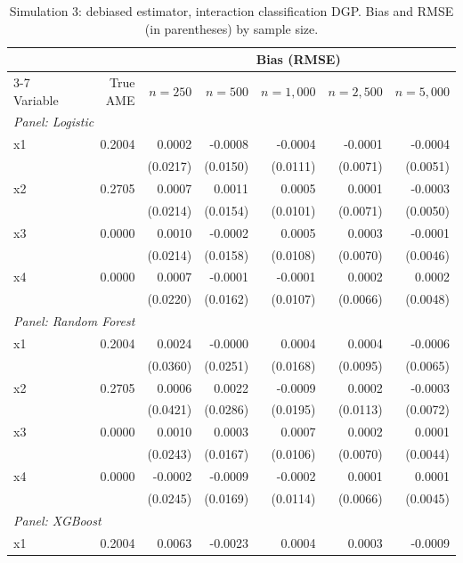 \begin{table}[htbp]
\centering
\small
\begin{threeparttable}
\caption{Simulation 3: debiased estimator, interaction classification DGP. Bias and RMSE (in parentheses) by sample size.}
\label{tab:sim3_bias_classification_interaction}
\begin{tabular}{lrrrrrr}
\toprule
 & & \multicolumn{5}{c}{Bias (RMSE)} \\
\cmidrule(lr){3-7}
Variable & True AME & $n=250$ & $n=500$ & $n=1,000$ & $n=2,500$ & $n=5,000$ \\
\midrule
\multicolumn{7}{l}{\textit{Panel: Logistic}} \\
\quad x1 & 0.2004 & 0.0002 & -0.0008 & -0.0004 & -0.0001 & -0.0004 \\
 &  & (0.0217) & (0.0150) & (0.0111) & (0.0071) & (0.0051) \\
\quad x2 & 0.2705 & 0.0007 & 0.0011 & 0.0005 & 0.0001 & -0.0003 \\
 &  & (0.0214) & (0.0154) & (0.0101) & (0.0071) & (0.0050) \\
\quad x3 & 0.0000 & 0.0010 & -0.0002 & 0.0005 & 0.0003 & -0.0001 \\
 &  & (0.0214) & (0.0158) & (0.0108) & (0.0070) & (0.0046) \\
\quad x4 & 0.0000 & 0.0007 & -0.0001 & -0.0001 & 0.0002 & 0.0002 \\
 &  & (0.0220) & (0.0162) & (0.0107) & (0.0066) & (0.0048) \\
\midrule
\multicolumn{7}{l}{\textit{Panel: Random Forest}} \\
\quad x1 & 0.2004 & 0.0024 & -0.0000 & 0.0004 & 0.0004 & -0.0006 \\
 &  & (0.0360) & (0.0251) & (0.0168) & (0.0095) & (0.0065) \\
\quad x2 & 0.2705 & 0.0006 & 0.0022 & -0.0009 & 0.0002 & -0.0003 \\
 &  & (0.0421) & (0.0286) & (0.0195) & (0.0113) & (0.0072) \\
\quad x3 & 0.0000 & 0.0010 & 0.0003 & 0.0007 & 0.0002 & 0.0001 \\
 &  & (0.0243) & (0.0167) & (0.0106) & (0.0070) & (0.0044) \\
\quad x4 & 0.0000 & -0.0002 & -0.0009 & -0.0002 & 0.0001 & 0.0001 \\
 &  & (0.0245) & (0.0169) & (0.0114) & (0.0066) & (0.0045) \\
\midrule
\multicolumn{7}{l}{\textit{Panel: XGBoost}} \\
\quad x1 & 0.2004 & 0.0063 & -0.0023 & 0.0004 & 0.0003 & -0.0009 \\

\end{tabular}
\end{threeparttable}
\end{table}
